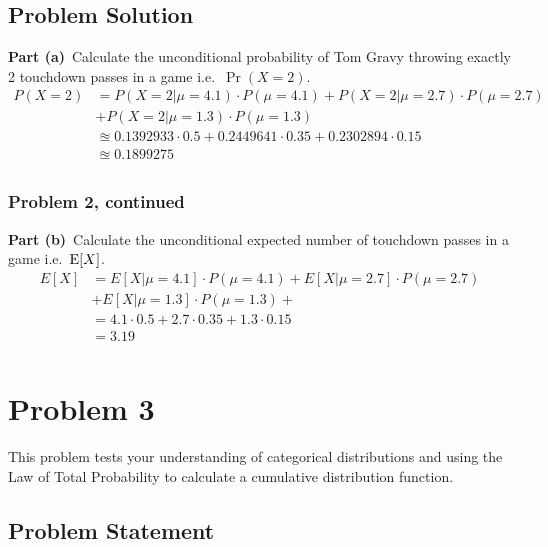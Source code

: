\documentclass[12pt]{article}
\theoremstyle{definition}
\begin{document}
\subsection*{Problem Solution}

\noindent
{\bf Part (a)}\ Calculate the unconditional probability of Tom Gravy throwing exactly 2 touchdown passes in a game i.e.\ $\Pr(X = 2)$.
\begin{align*}
P(X=2) &= P(X=2|\mu=4.1)\cdot P(\mu=4.1) + P(X=2|\mu=2.7)\cdot P(\mu=2.7) \\
       &+ P(X=2|\mu=1.3)\cdot P(\mu=1.3)\\
&\approxeq 0.1392933 \cdot 0.5 +  0.2449641 \cdot 0.35 +  0.2302894\cdot 0.15\\
&\approxeq 0.1899275\\
\end{align*}

\newpage
\subsubsection*{Problem 2, continued}

\vspace{2in}
\noindent
{\bf Part (b)}\ Calculate the unconditional expected number of touchdown passes in a game i.e.\  $\hbox{E}[ X ]$.
\begin{align*}
E[X] &= E[X|\mu=4.1] \cdot P(\mu=4.1) + E[X|\mu=2.7] \cdot P(\mu=2.7) \\
     &+ E[X|\mu=1.3] \cdot P(\mu=1.3) +\\
&= 4.1 \cdot 0.5 + 2.7 \cdot 0.35 + 1.3 \cdot 0.15 \\
& = 3.19\\
\end{align*}






\newpage
\section*{Problem 3}

This problem tests your understanding of categorical distributions and using the Law of Total Probability to calculate a cumulative distribution function.

\subsection*{Problem Statement}
\end{document}
